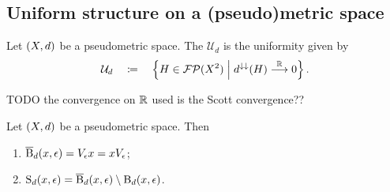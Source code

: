 \subsection{Uniform structure on a (pseudo)metric space}
\begin{definition}
Let $\left( X,d \right)$ be a pseudometric space. The  $\mathcal{U}_d$ is the uniformity given by
\[ \mathcal{U}_d \quad\coloneqq\quad \left\{ H\in \operatorname{\mathcal{FP}}(X^2) \;\middle|\; d^{\downarrow\downarrow}(H) \overset{\mathbb{R}}{\longrightarrow} 0 \right\}.  \]
\end{definition}
TODO the convergence on $\mathbb{R}$ used is the Scott convergence??

\begin{lemma}
Let $\left( X,d \right)$ be a pseudometric space. Then
\begin{enumerate}
\item $\operatorname{\overline{B}}_d(x,\epsilon) = V_\epsilon x = xV_\epsilon$;
\item $\operatorname{S}_d(x,\epsilon) = \operatorname{\overline{B}}_d(x,\epsilon)\setminus \operatorname{B}_d(x,\epsilon)$.
\end{enumerate}
\end{lemma}

